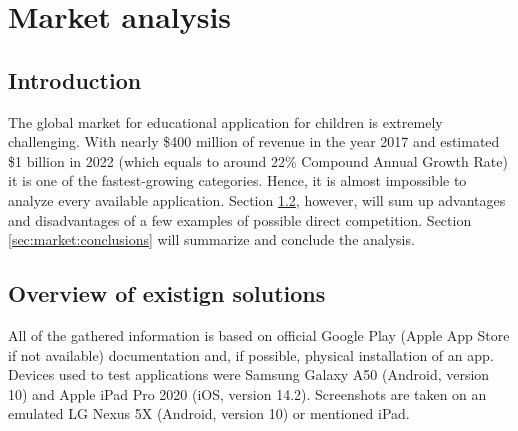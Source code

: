 \chapter{Market analysis}\label{ch:market}
\section{Introduction}\label{sec:market:introduction}
The global market for educational application for children is extremely challenging. With nearly \$400 million of revenue in the year 2017 and estimated \$1 billion in 2022 \cite{christianaWhatSizeKids2017} (which equals to around 22\% Compound Annual Growth Rate) it is one of the fastest-growing categories. Hence, it is almost impossible to analyze every available application. Section \ref{sec:market:solutions}, however, will sum up advantages and disadvantages of a few examples of possible direct competition. Section \ref{sec:market:conclusions} will summarize and conclude the analysis.


\section{Overview of existign solutions}\label{sec:market:solutions}
All of the gathered information is based on official Google Play (Apple App Store if not available) documentation and, if possible, physical installation of an app. Devices used to test applications were Samsung Galaxy A50 (Android, version 10) and Apple iPad Pro 2020 (iOS, version 14.2). Screenshots are taken on an emulated LG Nexus 5X (Android, version 10) or mentioned iPad.


